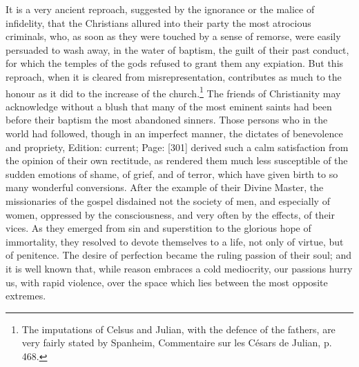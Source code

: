 It is a very ancient reproach, suggested by the ignorance or the malice of infidelity, that the Christians allured into their party the most atrocious criminals, who, as soon as they were touched by a sense of remorse, were easily persuaded to wash away, in the water of baptism, the guilt of their past conduct, for which the temples of the gods refused to grant them any expiation. But this reproach, when it is cleared from misrepresentation, contributes as much to the honour as it did to the increase of the church.\footnote{The imputations of Celsus and Julian, with the defence of the fathers, are very fairly stated by Spanheim, Commentaire sur les Césars de Julian, p. 468.} The friends of Christianity may acknowledge without a blush that many of the most eminent saints had been before their baptism the most abandoned sinners. Those persons who in the world had followed, though in an imperfect manner, the dictates of benevolence and propriety, Edition: current; Page: [301] derived such a calm satisfaction from the opinion of their own rectitude, as rendered them much less susceptible of the sudden emotions of shame, of grief, and of terror, which have given birth to so many wonderful conversions. After the example of their Divine Master, the missionaries of the gospel disdained not the society of men, and especially of women, oppressed by the consciousness, and very often by the effects, of their vices. As they emerged from sin and superstition to the glorious hope of immortality, they resolved to devote themselves to a life, not only of virtue, but of penitence. The desire of perfection became the ruling passion of their soul; and it is well known that, while reason embraces a cold mediocrity, our passions hurry us, with rapid violence, over the space which lies between the most opposite extremes.


